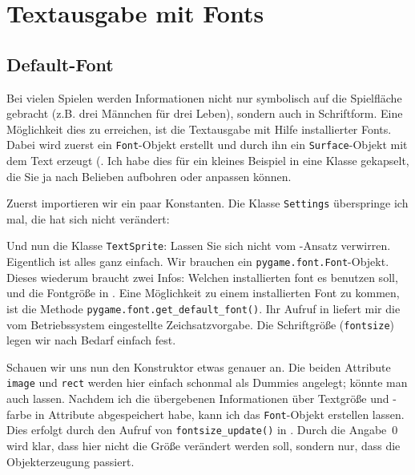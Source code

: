\section{Textausgabe mit Fonts}
\subsection{Default-Font}

Bei vielen Spielen werden Informationen nicht nur symbolisch auf die Spielfläche gebracht (z.B. drei Männchen für drei Leben), sondern auch in Schriftform. Eine Möglichkeit dies zu erreichen, ist die Textausgabe mit Hilfe installierter Fonts. Dabei wird zuerst ein \texttt{Font}-Objekt erstellt und durch ihn ein \texttt{Surface}-Objekt mit dem Text erzeugt (. Ich habe dies für ein kleines Beispiel in eine Klasse gekapselt, die Sie ja nach Belieben aufbohren oder anpassen können.

Zuerst importieren wir ein paar Konstanten. Die Klasse \texttt{Settings} überspringe ich mal, die hat sich nicht verändert:


Und nun die Klasse \texttt{TextSprite}: Lassen Sie sich nicht vom -Ansatz verwirren. Eigentlich ist alles ganz einfach. Wir brauchen ein \texttt{pygame.font.\-Font}-Objekt. Dieses wiederum braucht zwei Infos: Welchen installierten \Gls{font} es benutzen soll, und die Fontgröße in . Eine Möglichkeit zu einem installierten Font zu kommen, ist die Methode \texttt{pygame.font.get\_default\_font()}. Ihr Aufruf in  liefert mir die vom Betriebssystem eingestellte Zeichsatzvorgabe. Die Schriftgröße (\texttt{fontsize}) legen wir nach Bedarf einfach fest. 


Schauen wir uns nun den Konstruktor etwas genauer an. Die beiden Attribute \texttt{image} und \texttt{rect} werden hier einfach schonmal als Dummies angelegt; könnte man auch lassen. Nachdem ich die übergebenen Informationen über Textgröße und -farbe in Attribute abgespeichert habe, kann ich das \texttt{Font}-Objekt erstellen lassen. Dies erfolgt durch den Aufruf von \texttt{fontsize\_update()} in . Durch die Angabe~0 wird klar, dass hier nicht die Größe verändert werden soll, sondern nur, dass die Objekterzeugung passiert. 

